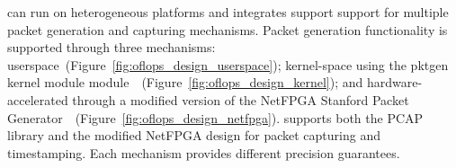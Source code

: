 \oflops can run on heterogeneous platforms and integrates support support for
multiple packet generation and capturing mechanisms.  Packet generation
functionality is supported through three mechanisms:
userspace~(Figure~\ref{fig:oflops_design_userspace}); kernel-space using the
pktgen kernel module
module~~(Figure~\ref{fig:oflops_design_kernel}); and
hardware-accelerated through a modified version of the NetFPGA Stanford Packet
Generator~~(Figure~\ref{fig:oflops_design_netfpga}).
\oflops supports both the PCAP library and the modified NetFPGA design for
packet capturing and timestamping. Each mechanism provides different precision
guarantees.

